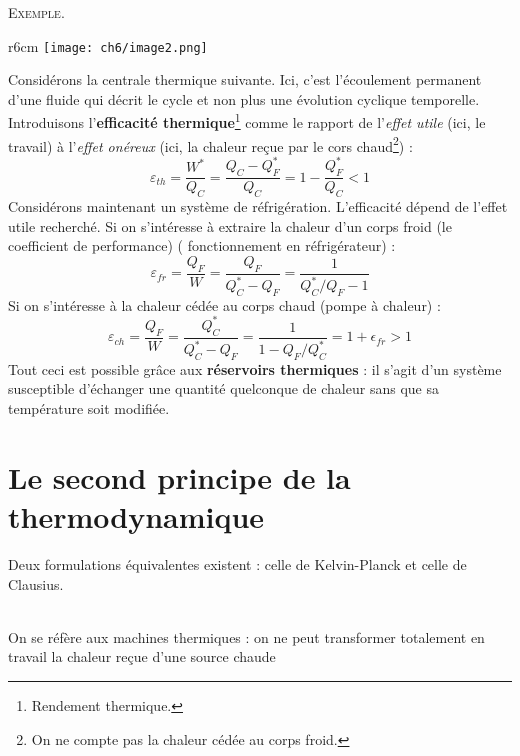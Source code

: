 	\textsc{Exemple}. \\
	\begin{wrapfigure}[9]{r}{6cm}
	\vspace{-9mm}
	\texttt{[image: ch6/image2.png]}
	\end{wrapfigure}
	Considérons la centrale thermique suivante. Ici, 
	c'est l'écoulement permanent d'une fluide qui décrit le cycle et 
	non plus une évolution cyclique temporelle.\\
	Introduisons l'\textbf{efficacité thermique}\footnote{Rendement 
	thermique.} comme le rapport de l'\textit{effet utile} (ici, le 
	travail) à l'\textit{effet onéreux} (ici, la chaleur reçue par 
	le cors chaud\footnote{On ne compte pas la chaleur cédée au corps 
	froid.}) :
	\begin{equation}
	\varepsilon_{th} = \frac{W^*}{Q_C} = \frac{Q_C-Q_F^*}{Q_C} = 1-
	\frac{Q_F^*}{Q_C} <1
	\end{equation}
	Considérons maintenant un système de réfrigération. L'efficacité 
	dépend de l'effet utile recherché. Si on s'intéresse à extraire 
	la chaleur d'un corps froid (le coefficient de performance) (
	fonctionnement en réfrigérateur) :
	\begin{equation}
	\varepsilon_{fr} = \frac{Q_F}{W} = \frac{Q_F}{Q_C^*-Q_F} = \frac{
	1}{Q_C^*/Q_F-1}
	\end{equation}
	Si on s'intéresse  à la chaleur cédée au corps chaud (pompe à 
	chaleur) : 
	\begin{equation}
	\varepsilon_{ch} = \frac{Q_F}{W}=\frac{Q_C^*}{Q_C^*-Q_F}=\frac{1}{
	1-Q_F/Q_C^*} = 1+\epsilon_{fr} >1
	\end{equation}
	Tout ceci est possible grâce aux \textbf{réservoirs thermiques} : 
	il s'agit d'un système susceptible d'échanger une quantité 
	quelconque de chaleur sans que sa température soit modifiée.
	
	
	\section{Le second principe de la thermodynamique}
	Deux formulations équivalentes existent : celle de Kelvin-Planck 
	et celle de Clausius. 
	
	\ \\
	On se réfère aux machines thermiques : on ne peut transformer 
	totalement en travail la chaleur reçue d'une source chaude\\
	
